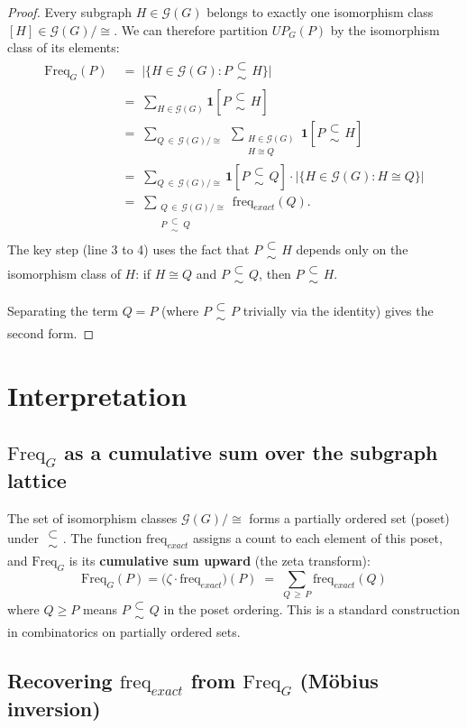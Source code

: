 \documentclass[11pt,a4paper]{article}
\theoremstyle{plain}
\theoremstyle{definition}
\newcommand{\Freq}{\mathrm{Freq}}
\newcommand{\freq}{\mathrm{freq}}
\newcommand{\GG}{\mathcal{G}}
\newcommand\subsetsim{\mathrel{\substack{
  \textstyle\subset\\[-0.2ex]\textstyle\sim}}}
\begin{document}
\begin{proof}
Every subgraph $H \in \GG(G)$ belongs to exactly one isomorphism class $[H] \in \GG(G)/{\cong}$. We can therefore partition $UP_G(P)$ by the isomorphism class of its elements:
\begin{align*}
\Freq_G(P) \;&=\; \big|\{H \in \GG(G) : P \subsetsim H\}\big| \\[4pt]
             &=\; \sum_{H \in \GG(G)} \mathbf{1}[P \subsetsim H] \\[4pt]
             &=\; \sum_{Q \,\in\, \GG(G)/{\cong}} \;\sum_{\substack{H \in \GG(G) \\[1pt] H \cong Q}} \mathbf{1}[P \subsetsim H] \\[4pt]
             &=\; \sum_{Q \,\in\, \GG(G)/{\cong}} \mathbf{1}[P \subsetsim Q] \cdot \big|\{H \in \GG(G) : H \cong Q\}\big| \\[4pt]
             &=\; \sum_{\substack{Q \,\in\, \GG(G)/{\cong} \\[2pt] P \,\subsetsim\, Q}} \freq_{exact}(Q).
\end{align*}
The key step (line 3 to 4) uses the fact that $P \subsetsim H$ depends only on the isomorphism class of $H$: if $H \cong Q$ and $P \subsetsim Q$, then $P \subsetsim H$.

Separating the term $Q = P$ (where $P \subsetsim P$ trivially via the identity) gives the second form.
\end{proof}

\section{Interpretation}

\subsection{$\Freq_G$ as a cumulative sum over the subgraph lattice}

The set of isomorphism classes $\GG(G)/{\cong}$ forms a partially ordered set (poset) under $\subsetsim$. The function $\freq_{exact}$ assigns a count to each element of this poset, and $\Freq_G$ is its \textbf{cumulative sum upward} (the zeta transform):
\[
\Freq_G(P) = \big(\zeta \cdot \freq_{exact}\big)(P) \;=\; \sum_{Q \,\geq\, P} \freq_{exact}(Q)
\]
where $Q \geq P$ means $P \subsetsim Q$ in the poset ordering. This is a standard construction in combinatorics on partially ordered sets.

\subsection{Recovering $\freq_{exact}$ from $\Freq_G$ (M\"obius inversion)}
\end{document}
